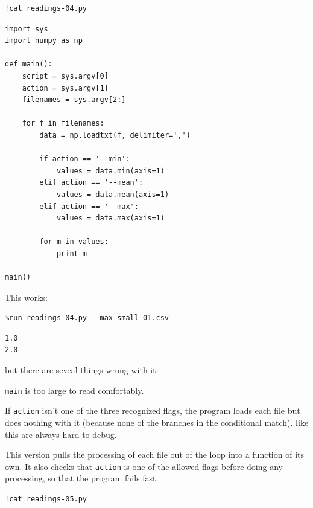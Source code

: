 \documentclass{book}
\begin{document}
\begin{verbatim}
!cat readings-04.py
\end{verbatim}

\begin{verbatim}
import sys
import numpy as np

def main():
    script = sys.argv[0]
    action = sys.argv[1]
    filenames = sys.argv[2:]

    for f in filenames:
        data = np.loadtxt(f, delimiter=',')

        if action == '--min':
            values = data.min(axis=1)
        elif action == '--mean':
            values = data.mean(axis=1)
        elif action == '--max':
            values = data.max(axis=1)

        for m in values:
            print m

main()
\end{verbatim}

This works:

\begin{verbatim}
%run readings-04.py --max small-01.csv
\end{verbatim}

\begin{verbatim}
1.0
2.0
\end{verbatim}

but there are seveal things wrong with it:

\begin{swcenumerate}
\item
  \texttt{main} is too large to read comfortably.
\item
  If \texttt{action} isn't one of the three recognized flags, the
  program loads each file but does nothing with it (because none of the
  branches in the conditional match).  like this are always hard to debug.
\end{swcenumerate}

This version pulls the processing of each file out of the loop into a
function of its own. It also checks that \texttt{action} is one of the
allowed flags before doing any processing, so that the program fails
fast:

\begin{verbatim}
!cat readings-05.py
\end{verbatim}
\end{document}
